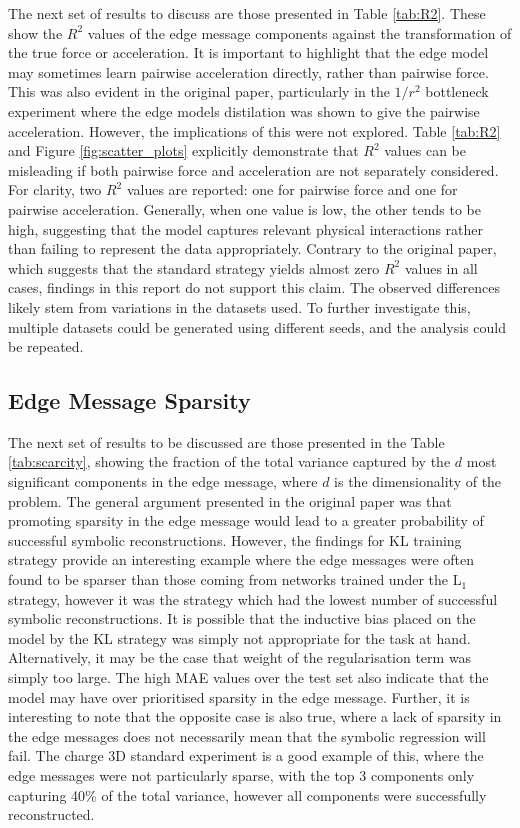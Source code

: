 \documentclass[11pt]{article}
\begin{document}
The next set of results to discuss are those presented in Table \ref{tab:R2}. These show the $R^2$ values of the edge message components against the transformation of the true force or acceleration. It is important to highlight that the edge model may sometimes learn pairwise acceleration directly, rather than pairwise force. This was also evident in the original paper, particularly in the $1/r^2$ bottleneck experiment where the edge models distilation was shown to give the pairwise acceleration. However, the implications of this were not explored. Table \ref{tab:R2} and Figure \ref{fig:scatter_plots} explicitly demonstrate that $R^2$ values can be misleading if both pairwise force and acceleration are not separately considered. For clarity, two $R^2$ values are reported: one for pairwise force and one for pairwise acceleration. Generally, when one value is low, the other tends to be high, suggesting that the model captures relevant physical interactions rather than failing to represent the data appropriately. Contrary to the original paper, which suggests that the standard strategy yields almost zero $R^2$ values in all cases, findings in this report do not support this claim. The observed differences likely stem from variations in the datasets used. To further investigate this, multiple datasets could be generated using different seeds, and the analysis could be repeated.


\subsection{Edge Message Sparsity}
The next set of results to be discussed are those presented in the Table \ref{tab:scarcity}, showing the fraction of the total variance captured by the $d$ most significant components in the edge message, where $d$ is the dimensionality of the problem. The general argument presented in the original paper was that promoting sparsity in the edge message would lead to a greater probability of successful symbolic reconstructions. However, the findings for KL training strategy provide an interesting example where the edge messages were often found to be sparser than those coming from networks trained under the L$_{1}$ strategy, however it was the strategy which had the lowest number of successful symbolic reconstructions. It is possible that the inductive bias placed on the model by the KL strategy was simply not appropriate for the task at hand. Alternatively, it may be the case that weight of the regularisation term was simply too large. The high MAE values over the test set also indicate that the model may have over prioritised sparsity in the edge message. Further, it is interesting to note that the opposite case is also true, where a lack of sparsity in the edge messages does not necessarily mean that the symbolic regression will fail. The charge 3D standard experiment is a good example of this, where the edge messages were not particularly sparse, with the top 3 components only capturing 40\% of the total variance, however all components were successfully reconstructed. 
\end{document}
